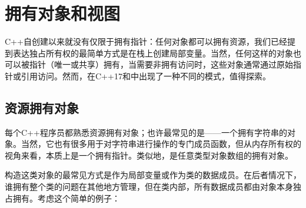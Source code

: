 \section{拥有对象和视图}

C++自创建以来就没有仅限于拥有指针：任何对象都可以拥有资源，我们已经提到表达独占所有权的最简单方式是在栈上创建局部变量。当然，任何这样的对象也可以被指针（唯一或共享）拥有，当需要非拥有访问时，这些对象通常通过原始指针或引用访问。然而，在C++17和\cpp[20] 中出现了一种不同的模式，值得探索。

\subsection{资源拥有对象}

每个C++程序员都熟悉资源拥有对象；也许最常见的是——一个拥有字符串的对象。当然，它也有很多用于对字符串进行操作的专门成员函数，但从内存所有权的视角来看，本质上是一个拥有指针。类似地，是任意类型对象数组的拥有对象。

构造这类对象的最常见方式是作为局部变量或作为类的数据成员。在后者情况下，谁拥有整个类的问题在其他地方管理，但在类内部，所有数据成员都由对象本身独占拥有。考虑这个简单的例子：

